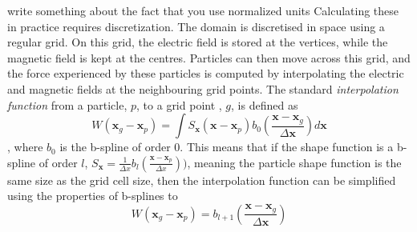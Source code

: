 \color{blue}write something about the fact that you use normalized units\color{black} 
\color{red}
Calculating these in practice requires discretization. The domain is discretised in space using a regular grid. On this grid, the electric field is stored at the vertices, while the magnetic field is kept at the centres. Particles can then move across this grid, and the force experienced by these particles is computed by interpolating the electric and magnetic fields at the neighbouring grid points. The standard \textit{interpolation function} from a particle, $p$, to a grid point , $g$, is defined as\cite{lapenta_exactly_2017} \[W(\textbf{x}_g - \textbf{x}_p) = \int S_{\textbf{x}}(\textbf{x}-\textbf{x}_p)b_0\left(\frac{\textbf{x}-\textbf{x}_g}{\Delta\textbf{x}}\right) d\textbf{x}\],
where $b_0$ is the b-spline of order 0. This means that if the shape function is a b-spline of order $l$, $S_\textbf{x} = \frac{1}{\Delta x}b_l\left(\frac{\textbf{x}-\textbf{x}_p}{\Delta x}\right))$, meaning the particle shape function is the same size as the grid cell size, then the interpolation function can be simplified using the properties of b-splines to 
\[W(\textbf{x}_g - \textbf{x}_p) =b_{l+1}\left(\frac{\textbf{x}-\textbf{x}_g}{\Delta \textbf{x}}\right)\]

